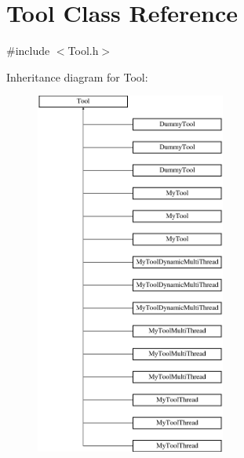 \hypertarget{classTool}{\section{Tool Class Reference}
\label{classTool}
}


{\ttfamily \#include $<$Tool.\-h$>$}

Inheritance diagram for Tool\-:\begin{figure}[H]
\begin{center}
\leavevmode
\includegraphics[height=12.000000cm]{classTool}
\end{center}
\end{figure}
